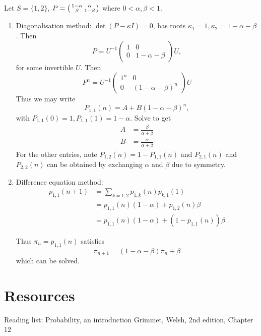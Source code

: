 \documentclass[a4paper]{article}
\begin{document}
\begin{eg}
  Let $S = \{1,2\}$, $P=\begin{psmallmatrix} 1-\alpha & \alpha \\ \beta & 1-\beta\end{psmallmatrix}$ where $0<\alpha, \beta < 1$.
  \begin{enumerate}
  \item Diagonalisation method: $\det(P-\kappa I)=0$, has roots $\kappa_1=1,\kappa_2=1-\alpha-\beta$. Then
  \[
    P = U^{-1}
    \begin{pmatrix}
      1 & 0\\
      0 & 1-\alpha-\beta
    \end{pmatrix}U,
  \]
  for some invertible $U$. Then
  \[
    P^n = U^{-1}
    \begin{pmatrix}
      1^n & 0 \\
      0 & (1-\alpha-\beta)^n
    \end{pmatrix} U
    \]
    Thus we may write
    \[
      P_{1,1}(n) = A+B(1-\alpha-\beta)^n,
    \]
    with $P_{1,1}(0)=1,P_{1,1}(1)=1-\alpha$. Solve to get
    \begin{align*}
      A &= \frac{\beta}{\alpha+\beta} \\
      B &= \frac{\alpha}{\alpha+\beta}
    \end{align*}
    For the other entries, note $P_{1,2}(n)=1-P_{1,1}(n)$ and $P_{2,1}(n)$ and $P_{2,2}(n)$ can be obtained by exchanging $\alpha$ and $\beta$ due to symmetry.

  \item Difference equation method:
    \begin{align*}
      p_{1,1}(n+1) &= \sum_{k=1,2} p_{1,k}(n)p_{k,1}(1) \\
                   &= p_{1,1}(n)(1-\alpha) + p_{1,2}(n)\beta \\
                   &= p_{1,1}(n)(1-\alpha) + (1-p_{1,1}(n))\beta
    \end{align*}

    Thus $\pi_{n}=p_{1,1}(n)$ satisfies
    \[
      \pi_{n+1} = (1-\alpha-\beta)\pi_n+\beta
    \]
    which can be solved.
  \end{enumerate}
\end{eg}


\appendix

\section{Resources}


Reading list: Probability, an introduction Grimmet, Welsh, 2nd edition, Chapter 12

\end{document}
